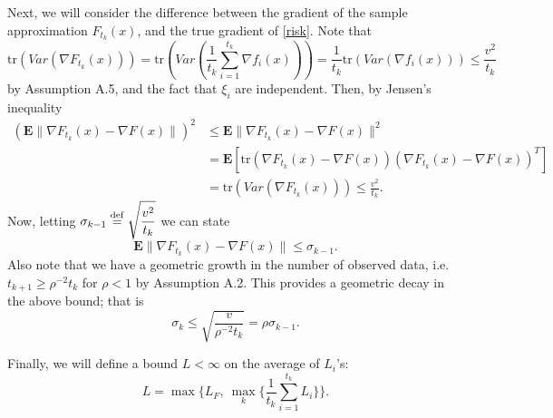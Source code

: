 \documentclass[11pt]{article}
\newcommand{\defeq}{\stackrel{\rm def}{=}}
\newcommand{\E}{\mathbf{E}}
\begin{document}
Next, we will consider the difference between the gradient of the sample approximation $F_{t_k}(x)$, and the true gradient of \eqref{risk}.  Note that 
\[
 \mbox{tr}(Var(\nabla F_{t_k}(x))) = \mbox{tr}(Var(\frac{1}{t_{k}}\sum_{i=1}^{t_k} \nabla f_i(x))) = \frac{1}{t_k}\mbox{tr}(Var(\nabla f_i(x))) \leq \frac{v^2}{t_k}
\]
by Assumption A.5, and the fact that $\xi_i$ are independent.  Then, by Jensen's inequality
\begin{align*}
 (\E \|\nabla F_{t_k}(x) - \nabla F(x)\|)^2 & \leq \E \|\nabla F_{t_k}(x) - \nabla F(x)\|^2 \\
  & = \E[\mbox{tr}(\nabla F_{t_k}(x) - \nabla F(x))(\nabla F_{t_k}(x) - \nabla F(x))^T]\\
  & = \mbox{tr}(Var(\nabla F_{t_k}(x))) \leq \frac{v^2}{t_k}.
\end{align*}
Now, letting $\displaystyle\sigma_{k-1} \defeq \sqrt{\frac{v^2}{t_k}}$ we can state
\begin{equation}\label{eq:var}
 \E \|\nabla F_{t_k}(x) - \nabla F(x)\| \leq \sigma_{k-1}.
\end{equation}
Also note that we have a geometric growth in the number of observed data, i.e. $t_{k+1} \geq \rho^{-2}t_k$ for $\rho<1$ by Assumption A.2.  This provides a geometric decay in the above bound; that is
\begin{equation}\label{eq:sigma}
 \sigma_k \leq \sqrt{\frac{v}{\rho^{-2}t_k}} = \rho \sigma_{k-1}.
\end{equation}

% 

\bigskip

Finally, we will define a bound $L<\infty$ on the average of $L_i$'s:
 \begin{equation}\label{eq:L}
  L = \max \{L_F, \ \max_k \{\frac{1}{t_k}\sum_{i=1}^{t_k}L_i\}\}.
 \end{equation}

\bigskip 
 
\end{document}
